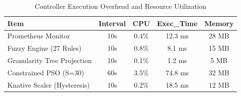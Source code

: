 \begin{table}[htbp]
\centering
\caption{Controller Execution Overhead and Resource Utilization}
\label{tab:overhead}
\begin{tabular}{lcccc}
\hline
Item & Interval & CPU & Exec\_Time & Memory \\
\hline
Prometheus Monitor & 10s & 0.4\% & 12.3 ms & 28 MB \\
Fuzzy Engine (27 Rules) & 10s & 0.8\% & 8.1 ms & 15 MB \\
Granularity Tree Projection & 10s & 0.1\% & 1.2 ms & 5 MB \\
Constrained PSO (S=30) & 60s & 3.5\% & 74.8 ms & 32 MB \\
Knative Scaler (Hysteresis) & 10s & 0.2\% & 18.5 ms & 12 MB \\
\hline
\end{tabular}
\end{table}